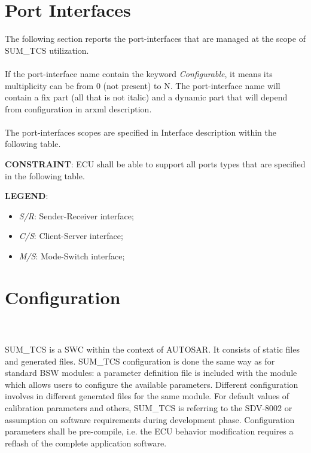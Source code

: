 \section{Port Interfaces}
\label{sec:PortInterfaces}

The following section reports the port-interfaces that are managed at the scope of SUM\_TCS utilization.
\\\\
If the port-interface name contain the keyword \textit{Configurable}, it means its multiplicity can be from 0 (not present) to N.
The port-interface name will contain a fix part (all that is not italic) and a dynamic part that will depend from configuration in arxml description.
\\\\
The port-interfaces scopes are specified in Interface description within the following table.

\textbf{CONSTRAINT}: ECU shall be able to support all ports types that are specified in the following table.

\textbf{LEGEND}:
\begin{itemize}
	\item \textit{S/R}: Sender-Receiver interface;
	\item \textit{C/S}: Client-Server interface;
	\item \textit{M/S}: Mode-Switch interface;
\end{itemize}


{
	    
	    
	    
}

\section{Configuration}
\\
{}
\\
SUM_TCS is a SWC within the context of AUTOSAR. It consists of static files and generated files.
SUM_TCS configuration is done the same way as for standard BSW modules: a parameter definition file is included with the module which allows users to configure the available parameters. 
Different configuration involves in different generated files for the same module. 
For default values of calibration parameters and others, SUM\_TCS is referring to the SDV-8002 or assumption on software requirements during development phase. 
Configuration parameters shall be pre-compile, i.e. the ECU behavior modification requires a reflash of the complete application software.

